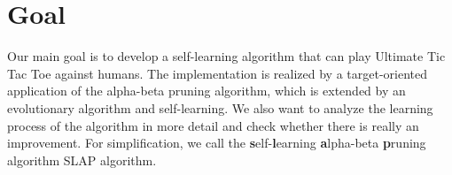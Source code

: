 \section{Goal}
Our main goal is to develop a self-learning algorithm that can play Ultimate Tic Tac Toe against humans. The implementation is realized by a target-oriented application of the alpha-beta pruning algorithm, which is extended by an evolutionary algorithm and self-learning. We also want to analyze the learning process of the algorithm in more detail and check whether there is really an improvement. For simplification, we call the \textbf{s}elf-\textbf{l}earning \textbf{a}lpha-beta \textbf{p}runing algorithm SLAP algorithm.
%
%
%


